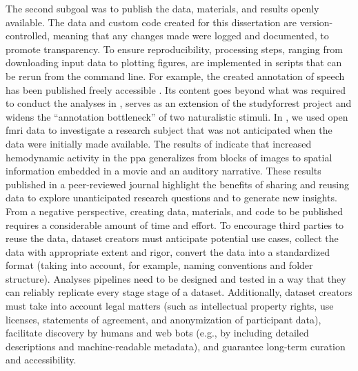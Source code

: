 

%

%
The second subgoal was to publish the data, materials, and results openly
available.
%
The data and custom code created for this dissertation are version-controlled,
meaning that any changes made were logged and documented, to promote
transparency.
%
To ensure reproducibility, processing steps, ranging from downloading input data
to plotting figures, are implemented in scripts that can be rerun from the
command line.
%
For example, the created annotation of speech has been published freely
accessible \citep{haeusler2021speechanno}.
%
Its content goes beyond what was required to conduct the analyses in
\citet{haeusler2022processing}, serves as an extension of the studyforrest
project and widens the ``annotation bottleneck'' \citep[][p.
16]{aliko2020naturalistic} of two naturalistic stimuli.
%
In \citet{haeusler2022processing}, we used open \ac{fmri} data to investigate a
research subject that was not anticipated when the data were initially made
available.
%
The results of \citet{haeusler2022processing} indicate that increased
hemodynamic activity in the \ac{ppa} generalizes from blocks of images to
spatial information embedded in a movie and an auditory narrative.
%
These results published in a peer-reviewed journal highlight the benefits of
sharing and reusing data to explore unanticipated research questions and to
generate new insights.
From a negative perspective, creating data, materials, and code to be published
requires a considerable amount of time and effort.
%
To encourage third parties to reuse the data, dataset creators must anticipate
potential use cases, collect the data with appropriate extent and rigor, convert
the data into a standardized format (taking into account, for example, naming
conventions and folder structure).
Analyses pipelines need to be designed and tested in a way that they can
reliably replicate every stage stage of a dataset.
Additionally, dataset creators must take into account legal matters (such as
intellectual property rights, use licenses, statements of agreement, and
anonymization of participant data), facilitate discovery by humans and web bots
(e.g., by including detailed descriptions and machine-readable metadata), and
guarantee long-term curation and accessibility.

